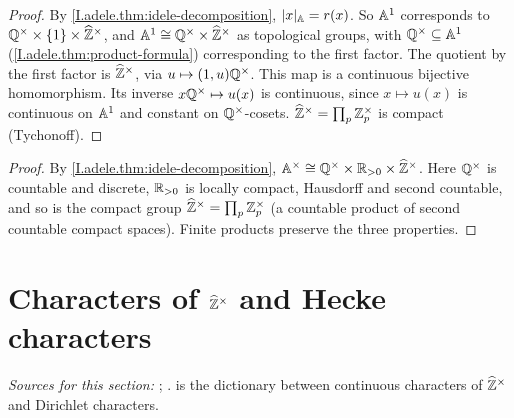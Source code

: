 \begin{theorem}
\end{theorem}
\begin{proof}
By \cref{I.adele.thm:idele-decomposition}, $\lvert x\rvert_{\mathbb{A}}=r(x)$. So $\mathbb{A}^1$ corresponds to $\mathbb{Q}^\times\times\{1\}\times\widehat{\mathbb{Z}}^\times$,
and $\mathbb{A}^1\cong\mathbb{Q}^\times\times\widehat{\mathbb{Z}}^\times$ as topological groups, with $\mathbb{Q}^\times\subseteq\mathbb{A}^1$ (\cref{I.adele.thm:product-formula})
corresponding to the first factor. The quotient by the first factor is $\widehat{\mathbb{Z}}^\times$, via $u\mapsto(1,u)\mathbb{Q}^\times$.
This map is a continuous bijective homomorphism. Its inverse $x\mathbb{Q}^\times\mapsto u(x)$ is continuous, since
$x\mapsto u(x)$ is continuous on $\mathbb{A}^1$ and constant on $\mathbb{Q}^\times$-cosets. $\widehat{\mathbb{Z}}^\times=\prod_p\mathbb{Z}_p^\times$ is
compact (Tychonoff).
\end{proof}

\begin{theorem}
\end{theorem}
\begin{proof}
By \cref{I.adele.thm:idele-decomposition}, $\mathbb{A}^\times\cong\mathbb{Q}^\times\times\mathbb{R}_{>0}\times\widehat{\mathbb{Z}}^\times$. Here $\mathbb{Q}^\times$ is
countable and discrete, $\mathbb{R}_{>0}$ is locally compact, Hausdorff and second countable, and so is the compact group
$\widehat{\mathbb{Z}}^\times=\prod_p\mathbb{Z}_p^\times$ (a countable product of second countable compact spaces). Finite products preserve
the three properties.
\end{proof}

\section{\texorpdfstring{Characters of $\widehat{\mathbb{Z}}^\times$ and Hecke characters}{Characters of Ẑ× and Hecke characters}}\label{sec:adele-characters}

\noindent\emph{Sources for this section:} \cite[§2.1]{GH}; \cite[§3.3]{Corv-ptIII-1}.
 is the dictionary between continuous characters of $\widehat{\mathbb{Z}}^\times$ and Dirichlet characters.

